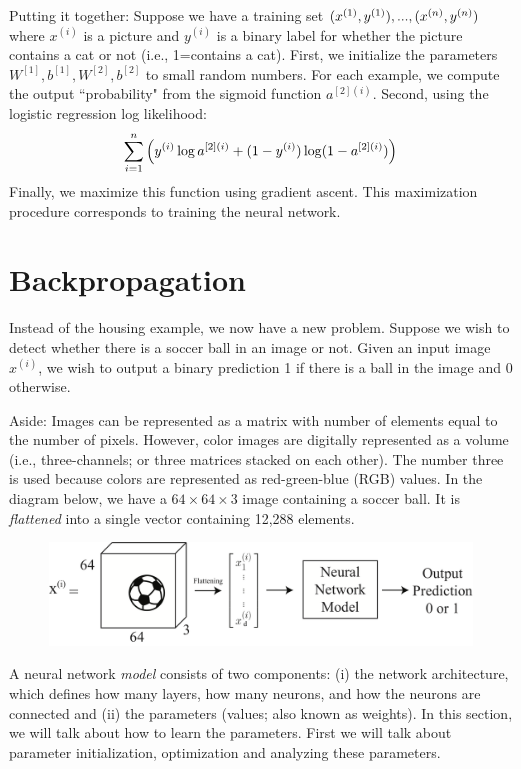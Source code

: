 \documentclass{article}
\numberwithin{equation}{section}
\begin{document}
Putting it together: Suppose we have a training set $(x^{(1)},y^{(1)}), ..., (x^{({n})}, y^{({n})})$ where $x^{(i)}$ is a picture and $y^{(i)}$ is a binary label for whether the picture contains a cat or not (i.e., 1=contains a cat). First, we initialize the parameters $W^{[1]}, b^{[1]}, W^{[2]}, b^{[2]}$ to small random numbers. For each example, we compute the output ``probability" from the sigmoid function $a^{[2](i)}$. Second, using the logistic regression log likelihood:
\begin{equation}
	\sum\limits_{i=1}^{{n}} \Big( y^{(i)}\log a^{[2](i)} + (1-y^{(i)}) \log (1-a^{[2](i)})\Big)
\end{equation}
Finally, we maximize this function using gradient ascent. This maximization procedure corresponds to training the neural network.

\section{Backpropagation}

Instead of the housing example, we now have a new problem. Suppose we wish to detect whether there is a soccer ball in an image or not. Given an input image $x^{(i)}$, we wish to output a binary prediction 1 if there is a ball in the image and 0 otherwise.

Aside: Images can be represented as a matrix with number of elements equal to the number of pixels. However, color images are digitally represented as a volume (i.e., three-channels; or three matrices stacked on each other). The number three is used because colors are represented as red-green-blue (RGB) values. In the diagram below, we have a $64 \times 64 \times 3$ image containing a soccer ball. It is \textit{flattened} into a single vector containing 12,288 elements.

\begin{figure}[h]
	\centering
	\includegraphics[width=0.90\linewidth]{image_d}
\end{figure}

A neural network \textit{model} consists of two components: (i) the network architecture, which defines how many layers, how many neurons, and how the neurons are connected and (ii) the parameters (values; also known as weights).
In this section, we will talk about how to learn the parameters. First we will talk about parameter initialization, optimization and analyzing these parameters.
\end{document}
